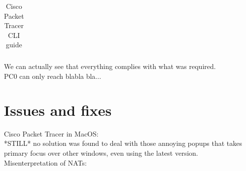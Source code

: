 \documentclass[11pt,a4paper]{report}
\begin{document}
\begin{flushleft}
\begin{center}
\begin{longtable}{ m{5cm} l }
                    \caption{Cisco Packet Tracer CLI guide}
                    \label{tab:cptg2}
                \end{longtable}
            \end{center}
    \end{flushleft}

    \lstset{style=termoutputs}
    

    

    \lstset{style=termoutputs}
    

    

    

    

    

    

    

    

    We can actually see that everything complies with what was required.\\
    PC0 can only reach blabla bla...%

\chapter{Issues and fixes}
    Cisco Packet Tracer in MacOS:\\
        \hspace*{10mm}*STILL* no solution was found to deal with those annoying popups that takes primary focus over other windows, even using the latest version.
    Misenterpretation of NATs:\\
        \hspace*{10mm}%
\end{document}
